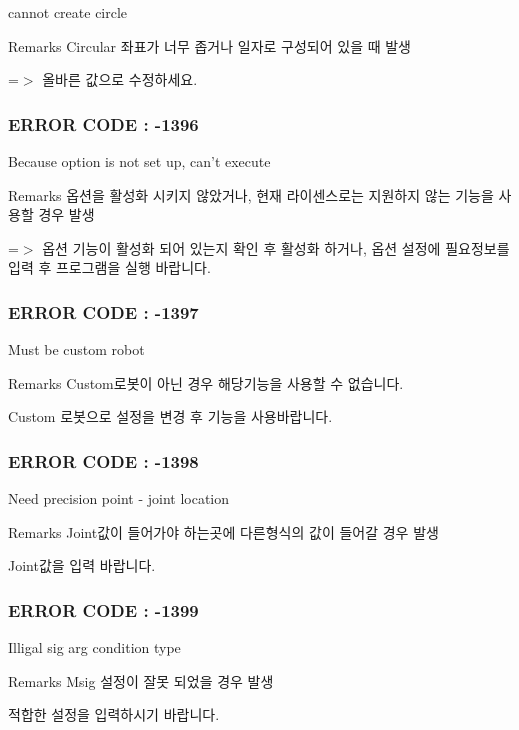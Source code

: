 cannot create circle \begin{DoxyRemark}{Remarks}
Circular 좌표가 너무 좁거나 일자로 구성되어 있을 때 발생 \par
 =$>$ 올바른 값으로 수정하세요.
\end{DoxyRemark}


 \subsubsection*{E\-R\-R\-O\-R C\-O\-D\-E \-: -\/1396 }

Because option is not set up, can't execute \begin{DoxyRemark}{Remarks}
옵션을 활성화 시키지 않았거나, 현재 라이센스로는 지원하지 않는 기능을 사용할 경우 발생\par
 =$>$ 옵션 기능이 활성화 되어 있는지 확인 후 활성화 하거나, 옵션 설정에 필요정보를 입력 후 프로그램을 실행 바랍니다.
\end{DoxyRemark}


 \subsubsection*{E\-R\-R\-O\-R C\-O\-D\-E \-: -\/1397 }

Must be custom robot \begin{DoxyRemark}{Remarks}
Custom로봇이 아닌 경우 해당기능을 사용할 수 없습니다.\par
 Custom 로봇으로 설정을 변경 후 기능을 사용바랍니다.
\end{DoxyRemark}


 \subsubsection*{E\-R\-R\-O\-R C\-O\-D\-E \-: -\/1398 }

Need precision point -\/ joint location \begin{DoxyRemark}{Remarks}
Joint값이 들어가야 하는곳에 다른형식의 값이 들어갈 경우 발생\par
 Joint값을 입력 바랍니다.
\end{DoxyRemark}


 \subsubsection*{E\-R\-R\-O\-R C\-O\-D\-E \-: -\/1399 }

Illigal sig arg condition type \begin{DoxyRemark}{Remarks}
Msig 설정이 잘못 되었을 경우 발생\par
 적합한 설정을 입력하시기 바랍니다.
\end{DoxyRemark}


